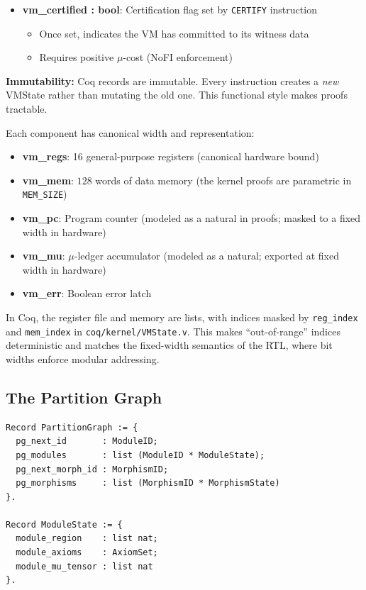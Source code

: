 \begin{itemize}
    \begin{itemize}
        \item Used by \texttt{CHSH\_TRIAL} to accumulate Bell test statistics
        \item Exported as \texttt{getWcSame00}--\texttt{getWcDiff11} in the Kami RTL
    \end{itemize}
    \item \textbf{vm\_certified : bool}: Certification flag set by \texttt{CERTIFY} instruction
    \begin{itemize}
        \item Once set, indicates the VM has committed to its witness data
        \item Requires positive $\mu$-cost (NoFI enforcement)
    \end{itemize}
\end{itemize}

\textbf{Immutability:} Coq records are immutable. Every instruction creates a \emph{new} VMState rather than mutating the old one. This functional style makes proofs tractable.

Each component has canonical width and representation:
\begin{itemize}
    \item \textbf{vm\_regs}: 16 general-purpose registers (canonical hardware bound)
    \item \textbf{vm\_mem}: $128$ words of data memory (the kernel proofs are parametric in \texttt{MEM\_SIZE})
    \item \textbf{vm\_pc}: Program counter (modeled as a natural in proofs; masked to a fixed width in hardware)
    \item \textbf{vm\_mu}: $\mu$-ledger accumulator (modeled as a natural; exported at fixed width in hardware)
    \item \textbf{vm\_err}: Boolean error latch
\end{itemize}
In Coq, the register file and memory are lists, with indices masked by \texttt{reg\_index} and \texttt{mem\_index} in \texttt{coq/kernel/VMState.v}. This makes “out-of-range” indices deterministic and matches the fixed-width semantics of the RTL, where bit widths enforce modular addressing.

\subsection{The Partition Graph}

\begin{lstlisting}
Record PartitionGraph := {
  pg_next_id       : ModuleID;
  pg_modules       : list (ModuleID * ModuleState);
  pg_next_morph_id : MorphismID;
  pg_morphisms     : list (MorphismID * MorphismState)
}.

Record ModuleState := {
  module_region    : list nat;
  module_axioms    : AxiomSet;
  module_mu_tensor : list nat
}.
\end{lstlisting}

